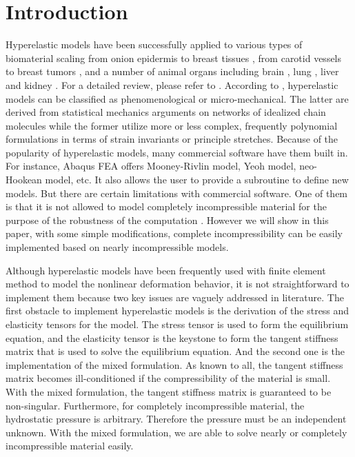 \section{Introduction}
Hyperelastic models have been successfully applied to various types of biomaterial scaling from onion epidermis \cite{Qian} to breast tissues \cite{OHagen}, from carotid vessels \cite{Zidi, Zidi2, Bols} to breast tumors \cite{Oberai}, and a number of animal organs including brain \cite{Karimi, Samani, Gilchrist}, lung  \cite{Wall, Wall2}, liver and kidney \cite{Fu, Untaroiu, Willinger}. For a detailed review, please refer to \cite{Kupriyanova}.
According to \cite{Steinmann}, hyperelastic models can be classified as phenomenological or micro-mechanical. The latter are derived from statistical mechanics arguments on networks of idealized chain molecules while the former utilize more or less complex, frequently polynomial formulations in terms of strain invariants or principle stretches. Because of the popularity of hyperelastic models, many commercial software have them built in. For instance, Abaqus FEA offers Mooney-Rivlin model, Yeoh model, neo-Hookean model, etc. It also allows the user to provide a subroutine to define new models. But there are certain limitations with commercial software. One of them is that it is not allowed to model completely incompressible material for the purpose of the robustness of the computation \cite{Abaqus}. However we will show in this paper, with some simple modifications, complete incompressibility can be easily implemented based on nearly incompressible models.

Although hyperelastic models have been frequently used with finite element method to model the nonlinear deformation behavior, it is not straightforward to implement them because two key issues are vaguely addressed in literature. The first obstacle to implement hyperelastic models is the derivation of the stress and elasticity tensors for the model. The stress tensor is used to form the equilibrium equation, and the elasticity tensor is the keystone to form the tangent stiffness matrix that is used to solve the equilibrium equation. And the second one is the implementation of the mixed formulation. As known to all, the tangent stiffness matrix becomes ill-conditioned if the compressibility of the material is small. With the mixed formulation, the tangent stiffness matrix is guaranteed to be non-singular. Furthermore, for completely incompressible material, the hydrostatic pressure is arbitrary. Therefore the pressure must be an independent unknown. With the mixed formulation, we are able to solve nearly or completely incompressible material easily. 

